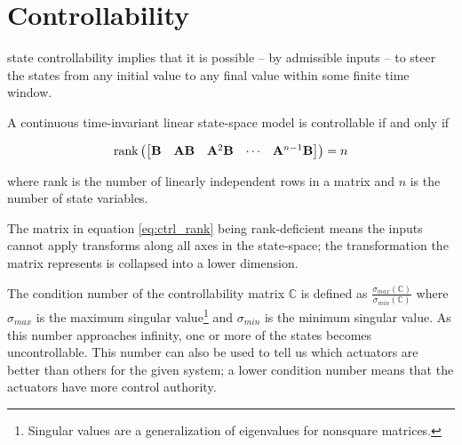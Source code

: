 \section{Controllability}

\Gls{state} controllability implies that it is possible -- by admissible inputs
-- to steer the \glspl{state} from any initial value to any final value within
some finite time window.
\begin{theorem}[Controllability]
  A continuous \gls{time-invariant} linear state-space \gls{model} is
  controllable if and only if

  \begin{equation}
    \operatorname{rank}\left(
    \begin{bmatrix}
      \mathbf{B} & \mathbf{A}\mathbf{B} & \mathbf{A}^2\mathbf{B} & \cdots &
      \mathbf{A}^{n-1}\mathbf{B}
    \end{bmatrix}
    \right) = n
    \label{eq:ctrl_rank}
  \end{equation}

  where rank is the number of linearly independent rows in a matrix and $n$ is
  the number of \gls{state} variables.
\end{theorem}

The matrix in equation \eqref{eq:ctrl_rank} being rank-deficient means the
\glspl{input} cannot apply transforms along all axes in the state-space; the
transformation the matrix represents is collapsed into a lower dimension.

The condition number of the controllability matrix $\mathbb{C}$ is defined as
$\frac{\sigma_{max}(\mathbb{C})}{\sigma_{min}(\mathbb{C})}$ where $\sigma_{max}$
is the maximum singular value\footnote{\label{footn:singular_val}Singular values
are a generalization of eigenvalues for nonsquare matrices.} and $\sigma_{min}$
is the minimum singular value. As this number approaches infinity, one or more
of the \glspl{state} becomes uncontrollable. This number can also be used to
tell us which actuators are better than others for the given \gls{system}; a
lower condition number means that the actuators have more control authority.
